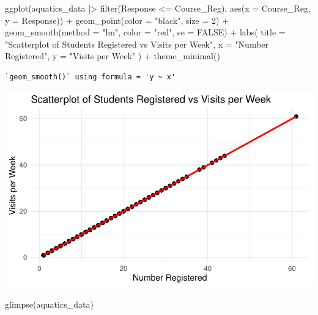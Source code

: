 \documentclass[
  letterpaper,
  DIV=11,
  numbers=noendperiod]{scrartcl}
\newenvironment{Shaded}{\begin{snugshade}}{\end{snugshade}}
\newcommand{\AttributeTok}[1]{\textcolor[rgb]{0.40,0.45,0.13}{#1}}
\newcommand{\ConstantTok}[1]{\textcolor[rgb]{0.56,0.35,0.01}{#1}}
\newcommand{\DecValTok}[1]{\textcolor[rgb]{0.68,0.00,0.00}{#1}}
\newcommand{\FunctionTok}[1]{\textcolor[rgb]{0.28,0.35,0.67}{#1}}
\newcommand{\NormalTok}[1]{\textcolor[rgb]{0.00,0.23,0.31}{#1}}
\newcommand{\SpecialCharTok}[1]{\textcolor[rgb]{0.37,0.37,0.37}{#1}}
\newcommand{\StringTok}[1]{\textcolor[rgb]{0.13,0.47,0.30}{#1}}
\begin{document}
\begin{Shaded}
\begin{Highlighting}[]
\FunctionTok{ggplot}\NormalTok{(aquatics\_data }\SpecialCharTok{|\textgreater{}} \FunctionTok{filter}\NormalTok{(Response }\SpecialCharTok{\textless{}=}\NormalTok{ Course\_Reg), }\FunctionTok{aes}\NormalTok{(}\AttributeTok{x =}\NormalTok{ Course\_Reg, }\AttributeTok{y =}\NormalTok{ Response)) }\SpecialCharTok{+}
  \FunctionTok{geom\_point}\NormalTok{(}\AttributeTok{color =} \StringTok{"black"}\NormalTok{, }\AttributeTok{size =} \DecValTok{2}\NormalTok{) }\SpecialCharTok{+}  
  \FunctionTok{geom\_smooth}\NormalTok{(}\AttributeTok{method =} \StringTok{"lm"}\NormalTok{, }\AttributeTok{color =} \StringTok{"red"}\NormalTok{, }\AttributeTok{se =} \ConstantTok{FALSE}\NormalTok{) }\SpecialCharTok{+}  
  \FunctionTok{labs}\NormalTok{(}
    \AttributeTok{title =} \StringTok{"Scatterplot of Students Registered vs Visits per Week"}\NormalTok{,}
    \AttributeTok{x =} \StringTok{"Number Registered"}\NormalTok{,}
    \AttributeTok{y =} \StringTok{"Visits per Week"}
\NormalTok{  ) }\SpecialCharTok{+}
  \FunctionTok{theme\_minimal}\NormalTok{()}
\end{Highlighting}
\end{Shaded}

\begin{verbatim}
`geom_smooth()` using formula = 'y ~ x'
\end{verbatim}

\includegraphics{paper_files/figure-pdf/unnamed-chunk-5-1.pdf}

\begin{Shaded}
\begin{Highlighting}[]
\FunctionTok{glimpse}\NormalTok{(aquatics\_data)}
\end{Highlighting}
\end{Shaded}
\end{document}
